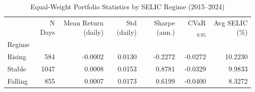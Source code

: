 \begin{table}
\caption{Equal-Weight Portfolio Statistics by SELIC Regime (2015--2024)}
\label{tab:regime_stats}
\begin{tabular}{lrrrrrr}
\toprule
 & N Days & Mean Return (daily) & Std (daily) & Sharpe (ann.) & CVaR$_{0.95}$ & Avg SELIC (\%) \\
Regime &  &  &  &  &  &  \\
\midrule
Rising & 584 & -0.0002 & 0.0130 & -0.2272 & -0.0272 & 10.2230 \\
Stable & 1047 & 0.0008 & 0.0153 & 0.8781 & -0.0329 & 9.9833 \\
Falling & 855 & 0.0007 & 0.0173 & 0.6199 & -0.0400 & 8.3272 \\
\bottomrule
\end{tabular}
\end{table}
